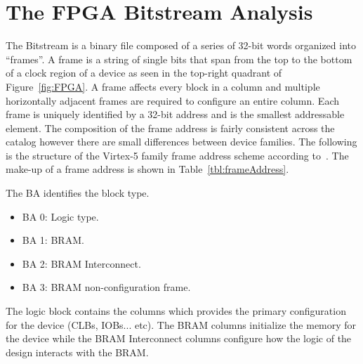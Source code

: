 \section{The \acrshort{FPGA} \gls{Bitstream} Analysis} \label{sec:fpgaBitStream}
The \Xilinx \gls{Bitstream} is a binary file composed of a series of 32-bit words organized into ``frames''.
A frame is a string of single bits that span from the top to the bottom of a clock region of a device as seen in the top-right quadrant of Figure~\ref{fig:FPGA}.
A frame affects every block in a column and multiple horizontally adjacent frames are required to configure an entire column.
Each frame is uniquely identified by a 32-bit address and is the smallest addressable element.
The composition of the frame address is fairly consistent across the \Xilinx catalog however there are small differences between device families.
The following is the structure of the Virtex-5 family frame address scheme according to~\cite{virtex5ConfigGuide}.
The make-up of a frame address is shown in Table~\ref{tbl:frameAddress}.
\begin{table}[h]
	\centering
	\caption{Frame Address}
	\label{tbl:frameAddress}
\end{table}

The \acrfull{BA} identifies the block type.
\begin{itemize}
	\item BA 0: Logic type.
	\item BA 1: \acrfull{BRAM}.
	\item BA 2: \acrshort{BRAM} Interconnect.
	\item BA 3: \acrshort{BRAM} non-configuration frame.
\end{itemize}
The logic block contains the columns which provides the primary configuration for the device (\acrshort{CLBs}, \acrshort{IOBs}... etc).
The \acrshort{BRAM} columns initialize the memory for the device while the \acrshort{BRAM} Interconnect columns configure how the logic of the design interacts with the \acrshort{BRAM}.

